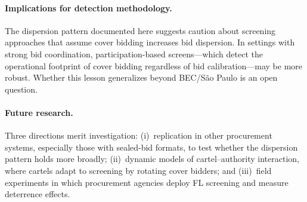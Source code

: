 \paragraph{Implications for detection methodology.}
The dispersion pattern documented here suggests caution about
screening approaches that assume cover bidding increases bid
dispersion. In settings with strong bid coordination,
participation-based screens---which detect the operational
footprint of cover bidding regardless of bid calibration---may be
more robust. Whether this lesson generalizes beyond BEC/S\~ao Paulo
is an open question.

\paragraph{Future research.}
Three directions merit investigation: (i)~replication in other
procurement systems, especially those with sealed-bid formats, to
test whether the dispersion pattern holds more broadly;
(ii)~dynamic models of cartel--authority interaction, where cartels
adapt to screening by rotating cover bidders; and (iii)~field
experiments in which procurement agencies deploy FL screening and
measure deterrence effects.
